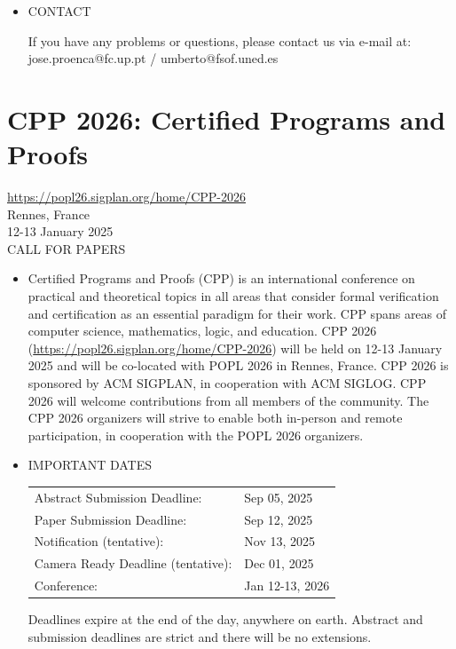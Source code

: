 \documentclass[prodmode,acmtecs]{acmsmall} %
\begin{document}
\begin{itemize}
\item  CONTACT 
 
  If you have any problems or questions, please contact us via e-mail at: jose.proenca@fc.up.pt / umberto@fsof.uned.es 
 
\end{itemize}\section{CPP 2026: Certified Programs and Proofs}\label{CPP2026}  \href{https://popl26.sigplan.org/home/CPP-2026}{https://popl26.sigplan.org/home/CPP-2026}\\ 
  Rennes, France\\ 
  12-13 January 2025\\ 
CALL FOR PAPERS 

\begin{itemize}\item  Certified Programs and Proofs (CPP) is an international conference on practical and theoretical topics in all areas that consider formal verification and certification as an essential paradigm for their work. CPP spans areas of computer science, mathematics, logic, and education. CPP 2026 (\href{https://popl26.sigplan.org/home/CPP-2026}{https://popl26.sigplan.org/home/CPP-2026}) will be held on 12-13 January 2025 and will be co-located with POPL 2026 in Rennes, France. CPP 2026 is sponsored by ACM SIGPLAN, in cooperation with ACM SIGLOG. CPP 2026 will welcome contributions from all members of the community. The CPP 2026 organizers will strive to enable both in-person and remote participation, in cooperation with the POPL 2026 organizers. 
 
\item  IMPORTANT DATES 
 
\begin{tabulary}{\linewidth}{LL}Abstract Submission Deadline:  & Sep 05, 2025 \\
Paper Submission Deadline:  & Sep 12, 2025 \\
Notification (tentative):  & Nov 13, 2025 \\
Camera Ready Deadline (tentative):  & Dec 01, 2025 \\
Conference:  & Jan 12-13, 2026 \\
\end{tabulary}
 
  Deadlines expire at the end of the day, anywhere on earth. Abstract and submission deadlines are strict and there will be no extensions. 
 

\end{itemize}
\end{document}
